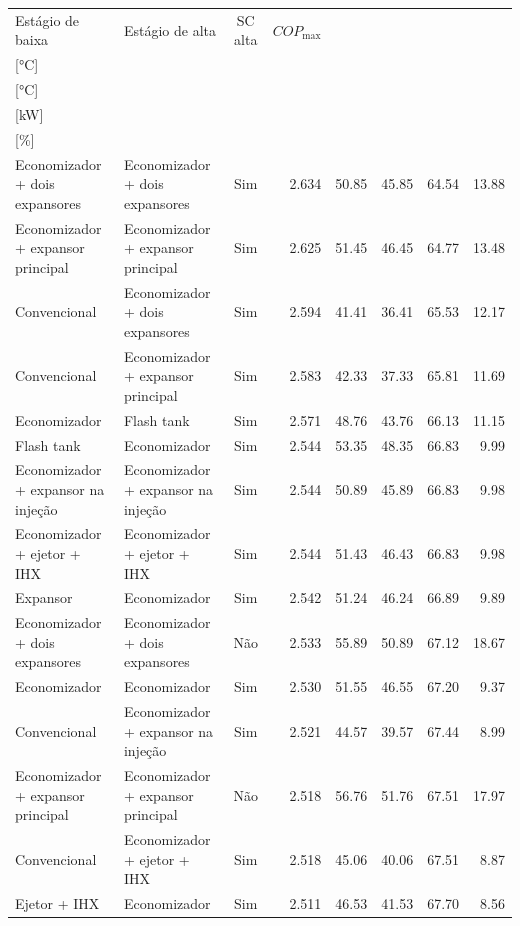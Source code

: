 {\small\setlength{\tabcolsep}{4pt}\renewcommand{\arraystretch}{1.12}
\begin{tabular}{llcrrrrr}
\toprule
Estágio de baixa & Estágio de alta & SC alta & $COP_{\max}$ & \shortstack{$T_{\mathrm{cond,l}}^*$\\{[°C]}} & \shortstack{$T_{\mathrm{evap,h}}^*$\\{[°C]}} & \shortstack{$\dot W_{\mathrm{liq}}$\\{[kW]}} & \shortstack{$\Delta COP_{\mathrm{opt}}$\\{[\%]}} \\
\midrule
Economizador + dois expansores & Economizador + dois expansores & Sim & 2.634 & 50.85 & 45.85 & 64.54 & 13.88 \\
Economizador + expansor principal & Economizador + expansor principal & Sim & 2.625 & 51.45 & 46.45 & 64.77 & 13.48 \\
Convencional & Economizador + dois expansores & Sim & 2.594 & 41.41 & 36.41 & 65.53 & 12.17 \\
Convencional & Economizador + expansor principal & Sim & 2.583 & 42.33 & 37.33 & 65.81 & 11.69 \\
Economizador & Flash tank & Sim & 2.571 & 48.76 & 43.76 & 66.13 & 11.15 \\
Flash tank & Economizador & Sim & 2.544 & 53.35 & 48.35 & 66.83 & 9.99 \\
Economizador + expansor na injeção & Economizador + expansor na injeção & Sim & 2.544 & 50.89 & 45.89 & 66.83 & 9.98 \\
Economizador + ejetor + IHX & Economizador + ejetor + IHX & Sim & 2.544 & 51.43 & 46.43 & 66.83 & 9.98 \\
Expansor & Economizador & Sim & 2.542 & 51.24 & 46.24 & 66.89 & 9.89 \\
Economizador + dois expansores & Economizador + dois expansores & Não & 2.533 & 55.89 & 50.89 & 67.12 & 18.67 \\
Economizador & Economizador & Sim & 2.530 & 51.55 & 46.55 & 67.20 & 9.37 \\
Convencional & Economizador + expansor na injeção & Sim & 2.521 & 44.57 & 39.57 & 67.44 & 8.99 \\
Economizador + expansor principal & Economizador + expansor principal & Não & 2.518 & 56.76 & 51.76 & 67.51 & 17.97 \\
Convencional & Economizador + ejetor + IHX & Sim & 2.518 & 45.06 & 40.06 & 67.51 & 8.87 \\
Ejetor + IHX & Economizador & Sim & 2.511 & 46.53 & 41.53 & 67.70 & 8.56 \\

\end{tabular}}
